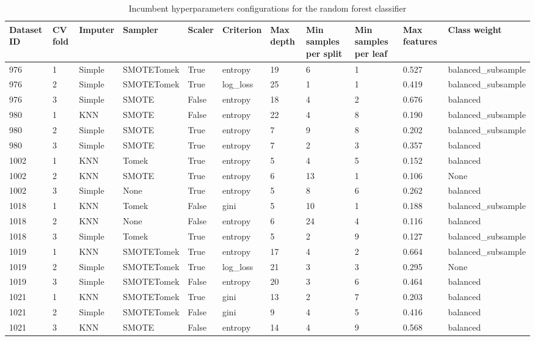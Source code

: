 \documentclass[11pt]{article}
\begin{document}
\begin{table}
\footnotesize
\caption{Incumbent hyperparameters configurations for the random forest classifier}
\center
\begin{tabularx}{22cm}{lllllllXXXX}
\toprule
Dataset ID & CV fold & Imputer & Sampler & Scaler & Criterion & Max depth & Min samples per split & Min samples per leaf & Max features & Class weight \\
\midrule
976 & 1 & Simple & SMOTETomek & True & entropy & 19 & 6 & 1 & 0.527 & balanced\_subsample \\
976 & 2 & Simple & SMOTETomek & True & log\_loss & 25 & 1 & 1 & 0.419 & balanced\_subsample \\
976 & 3 & Simple & SMOTE & False & entropy & 18 & 4 & 2 & 0.676 & balanced \\
\midrule
980 & 1 & KNN & SMOTE & False & entropy & 22 & 4 & 8 & 0.190 & balanced\_subsample \\
980 & 2 & Simple & SMOTE & True & entropy & 7 & 9 & 8 & 0.202 & balanced\_subsample \\
980 & 3 & Simple & SMOTE & True & entropy & 7 & 2 & 3 & 0.357 & balanced \\
\midrule
1002 & 1 & KNN & Tomek & True & entropy & 5 & 4 & 5 & 0.152 & balanced \\
1002 & 2 & KNN & SMOTE & True & entropy & 6 & 13 & 1 & 0.106 & None \\
1002 & 3 & Simple & None & True & entropy & 5 & 8 & 6 & 0.262 & balanced \\
\midrule
1018 & 1 & KNN & Tomek & False & gini & 5 & 10 & 1 & 0.188 & balanced\_subsample \\
1018 & 2 & KNN & None & False & entropy & 6 & 24 & 4 & 0.116 & balanced \\
1018 & 3 & Simple & Tomek & True & entropy & 5 & 2 & 9 & 0.127 & balanced\_subsample \\
\midrule
1019 & 1 & KNN & SMOTETomek & True & entropy & 17 & 4 & 2 & 0.664 & balanced\_subsample \\
1019 & 2 & Simple & SMOTETomek & True & log\_loss & 21 & 3 & 3 & 0.295 & None \\
1019 & 3 & Simple & SMOTETomek & False & entropy & 20 & 3 & 6 & 0.464 & balanced \\
\midrule
1021 & 1 & KNN & SMOTETomek & True & gini & 13 & 2 & 7 & 0.203 & balanced \\
1021 & 2 & Simple & SMOTETomek & False & gini & 9 & 4 & 5 & 0.416 & balanced \\
1021 & 3 & KNN & SMOTE & False & entropy & 14 & 4 & 9 & 0.568 & balanced \\

\end{tabularx}
\end{table}
\end{document}

